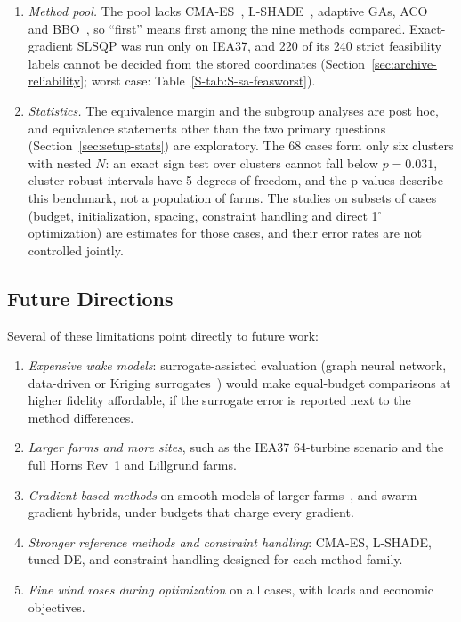 \begin{enumerate}
\item \emph{Method pool.} The pool lacks CMA-ES~\cite{HansenOstermeier2001}, L-SHADE~\cite{Tanabe2014}, adaptive GAs, ACO~\cite{Eroglu2012} and BBO~\cite{Bansal2017}, so ``first'' means first among the nine methods compared. Exact-gradient SLSQP was run only on IEA37, and 220 of its 240 strict feasibility labels cannot be decided from the stored coordinates (Section~\ref{sec:archive-reliability}; worst case: Table~\ref{S-tab:S-sa-feasworst}).
\item \emph{Statistics.} The equivalence margin and the subgroup analyses are post hoc, and equivalence statements other than the two primary questions (Section~\ref{sec:setup-stats}) are exploratory. The 68 cases form only six clusters with nested $N$: an exact sign test over clusters cannot fall below $p=0.031$, cluster-robust intervals have 5 degrees of freedom, and the p-values describe this benchmark, not a population of farms. The studies on subsets of cases (budget, initialization, spacing, constraint handling and direct 1$^\circ$ optimization) are estimates for those cases, and their error rates are not controlled jointly.
\end{enumerate}

\subsection{Future Directions}
Several of these limitations point directly to future work:
\begin{enumerate}
\item \emph{Expensive wake models}: surrogate-assisted evaluation (graph neural network, data-driven or Kriging surrogates~\cite{Yang2023,Wang2024,Li2025}) would make equal-budget comparisons at higher fidelity affordable, if the surrogate error is reported next to the method differences.
\item \emph{Larger farms and more sites}, such as the IEA37 64-turbine scenario and the full Horns Rev~1 and Lillgrund farms.
\item \emph{Gradient-based methods} on smooth models of larger farms~\cite{Rodrigues2024}, and swarm--gradient hybrids, under budgets that charge every gradient.
\item \emph{Stronger reference methods and constraint handling}: CMA-ES, L-SHADE, tuned DE, and constraint handling designed for each method family.
\item \emph{Fine wind roses during optimization} on all cases, with loads and economic objectives.
\end{enumerate}
